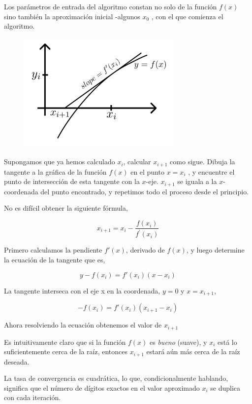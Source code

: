 Los parámetros de entrada del algoritmo constan no solo de la función $f(x)$ sino también la aproximación inicial -algunos $x_0$ , con el que comienza el algoritmo.

\begin{figure}[h!]
	\centering
	\includegraphics[width=0.45\linewidth]{img/roots_newton}
	\label{fig:rootsnewton}
\end{figure}


Supongamos que ya hemos calculado  $x_i$, calcular  $x_{i+1}$ como sigue. Dibuja la tangente a la gráfica de la función  $f(x)$ en el punto $x = x_i$ , y encuentre el punto de intersección de esta tangente con la $x$-eje. $x_{i+1}$ se iguala a la $x$-coordenada del punto encontrado, y repetimos todo el proceso desde el principio.

No es difícil obtener la siguiente fórmula,

$$ x_{i+1} = x_i - \frac{f(x_i)}{f^\prime(x_i)} $$

Primero calculamos la pendiente $f'(x)$, derivado de $f(x)$, y luego determine la ecuación de la tangente que es,

$$ y - f(x_i) = f'(x_i)(x - x_i) $$

La tangente interseca con el eje x en la coordenada, $y = 0$ y $x = x_{i+1}$,

$$ - f(x_i) = f'(x_i)(x_{i+1} - x_i) $$

Ahora resolviendo la ecuación obtenemos el valor de $x_{i+1}$

Es intuitivamente claro que si la función $f(x)$ es \emph{bueno} (suave), y $x_i$ está lo suficientemente cerca de la raíz, entonces $x_{i+1}$  estará aún más cerca de la raíz deseada.

La tasa de convergencia es cuadrática, lo que, condicionalmente hablando, significa que el número de dígitos exactos en el valor aproximado $x_i$ se duplica con cada iteración.